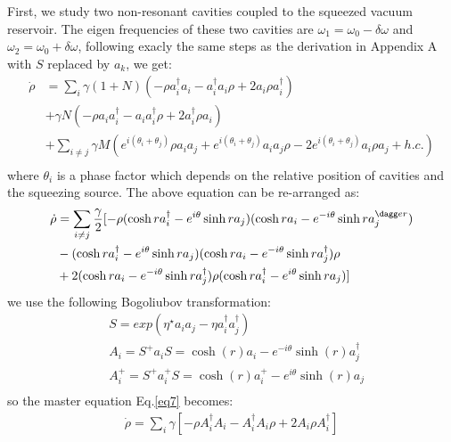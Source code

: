 \documentclass{article}
\begin{document}
First, we study two non-resonant cavities coupled to the squeezed vacuum reservoir. The eigen frequencies of these two cavities are $\omega_1=\omega_0-\delta \omega$ and $\omega_2=\omega_0+\delta \omega$, following exacly the same steps as the derivation in Appendix A with $S$ replaced by $a_k$, we get:
\begin{equation}
\label{eq6}
\begin{split}
\dot{\rho}&=\sum_{i}\gamma(1+N)(-\rho a_{i}^{\dagger}a_{i}-a_{i}^{\dagger}a_{i}\rho+2a_{i}\rho a_{i}^{\dagger})\\
&+\gamma N(-\rho a_{i}a_{i}^{\dagger}-a_{i}a_{i}^{\dagger}\rho+2a_{i}^{\dagger}\rho a_{i})\\
&+\sum_{i\ne j}\gamma M(e^{i(\theta_i+\theta_j)}\rho a_{i}a_{j}+e^{i(\theta_i+\theta_j)}a_{i}a_{j}\rho-2e^{i(\theta_i+\theta_j)}a_{i}\rho a_{j}+h.c.)\\
\end{split}
\end{equation}
where $\theta_i$ is a phase factor which depends on the relative position of cavities and the squeezing source. The above equation can be re-arranged as:
\begin{equation}
\label{eq7}
\begin{split}
\dot{\rho}&=\sum_{i\ne j}\frac{\gamma}{2}[-\rho(\cosh ra_{i}^{\dagger}-e^{i\theta}\sinh ra_{j})(\cosh ra_{i}-e^{-i\theta}\sinh ra_{j}^{\dagg
er})\\
&-(\cosh ra_{i}^{\dagger}-e^{i\theta}\sinh ra_{j})(\cosh ra_{i}-e^{-i\theta}\sinh ra_{j}^{\dagger})\rho\\
&+2(\cosh ra_{i}-e^{-i\theta}\sinh ra_{j}^{\dagger})\rho(\cosh ra_{i}^{\dagger}-e^{i\theta}\sinh ra_{j})]\\
\end{split}
\end{equation}
we use the following Bogoliubov transformation\cite{Bogoliubov}:
\begin{equation}
\label{eq8}
\begin{split}
&S=exp(\eta^{\star}a_{i}a_{j}-\eta a_{i}^{\dagger}a_{j}^{\dagger})\\
&A_{i}=S^{+}a_{i}S=\cosh(r)a_{i}-e^{-i\theta}\sinh(r)a_{j}^{\dagger} \\
&A_{i}^{+}=S^{+}a_{i}^{+}S=\cosh(r)a_{i}^{+}-e^{i\theta}\sinh(r)a_{j}\\
\end{split}
\end{equation}
so the master equation Eq.\eqref{eq7} becomes:
\begin{equation}
\label{eq9}
\begin{split}
\dot{\rho}=\sum_{i}\gamma[-\rho A_{i}^{\dagger}A_{i}-A_{i}^{\dagger}A_{i}\rho+2A_{i}\rho A_{i}^{\dagger}]
\end{split}
\end{equation}
\end{document}
